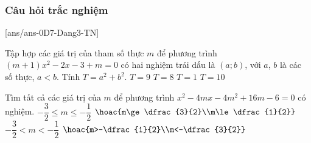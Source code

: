 \subsubsection{Câu hỏi trắc nghiệm}
[ans/ans-0D7-Dang3-TN]
\begin{ex}%
	Tập hợp các giá trị của tham số thực $m$ để phương trình $(m+1)x^2-2x-3+m=0$ có hai nghiệm trái dấu là $(a;b)$, với $a$, $b$ là các số thực, $a<b$. Tính $T=a^2+b^2$.
	\choice
	{$ T=9 $}
	{$ T=8 $}
	{$ T=1 $}
	{\True $ T=10 $}
\end{ex}
\begin{ex}%
	Tìm tất cả các giá trị của $m$ để phương trình $x^2-4mx-4m^2+16m-6=0$ có nghiệm.
	\choice	
	{$-\dfrac{3}{2}\le m \le -\dfrac{1}{2}$}
	{\True $\hoac{m\ge \dfrac{3}{2}\\m\le \dfrac{1}{2}}$}
	{$-\dfrac{3}{2}< m < -\dfrac{1}{2}$}
	{$\hoac{m>-\dfrac{1}{2}\\m<-\dfrac{3}{2}}$}	
\end{ex}
